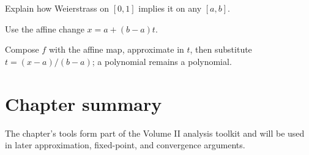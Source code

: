 \begin{exercise}\label{exr:ii21-expand-16}
Explain how Weierstrass on \([0,1]\) implies it on any \([a,b]\).
\end{exercise}
\begin{hint}
Use the affine change \(x=a+(b-a)t\).
\end{hint}
\begin{solution}
Compose \(f\) with the affine map, approximate in \(t\), then substitute \(t=(x-a)/(b-a)\); a polynomial remains a polynomial.
\end{solution}
\section*{Chapter summary}
The chapter's tools form part of the Volume II analysis toolkit and will be used in later approximation, fixed-point, and convergence arguments.
